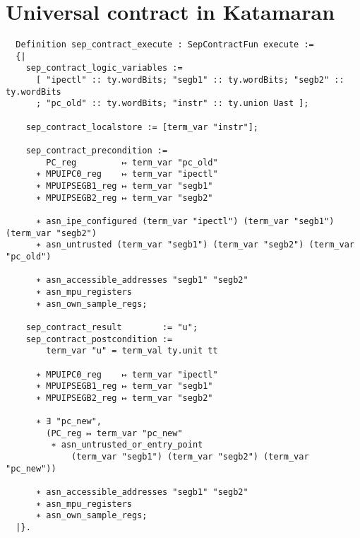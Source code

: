\section{Universal contract in Katamaran}

\begin{verbatim}
  Definition sep_contract_execute : SepContractFun execute :=
  {|
    sep_contract_logic_variables :=
      [ "ipectl" :: ty.wordBits; "segb1" :: ty.wordBits; "segb2" :: ty.wordBits
      ; "pc_old" :: ty.wordBits; "instr" :: ty.union Uast ];

    sep_contract_localstore := [term_var "instr"];

    sep_contract_precondition :=
        PC_reg         ↦ term_var "pc_old"
      ∗ MPUIPC0_reg    ↦ term_var "ipectl"
      ∗ MPUIPSEGB1_reg ↦ term_var "segb1"
      ∗ MPUIPSEGB2_reg ↦ term_var "segb2"

      ∗ asn_ipe_configured (term_var "ipectl") (term_var "segb1") (term_var "segb2")
      ∗ asn_untrusted (term_var "segb1") (term_var "segb2") (term_var "pc_old")

      ∗ asn_accessible_addresses "segb1" "segb2"
      ∗ asn_mpu_registers
      ∗ asn_own_sample_regs;

    sep_contract_result        := "u";
    sep_contract_postcondition :=
        term_var "u" = term_val ty.unit tt

      ∗ MPUIPC0_reg    ↦ term_var "ipectl"
      ∗ MPUIPSEGB1_reg ↦ term_var "segb1"
      ∗ MPUIPSEGB2_reg ↦ term_var "segb2"

      ∗ ∃ "pc_new",
        (PC_reg ↦ term_var "pc_new"
         ∗ asn_untrusted_or_entry_point
             (term_var "segb1") (term_var "segb2") (term_var "pc_new"))

      ∗ asn_accessible_addresses "segb1" "segb2"
      ∗ asn_mpu_registers
      ∗ asn_own_sample_regs;
  |}.
\end{verbatim}

